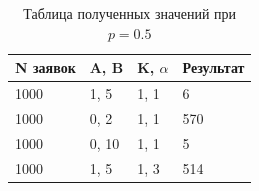 \FloatBarrier
\begin{table}[h]
	\caption{Таблица полученных значений при $ p = 0.5 $}
	\centering
	\begin{tabular}{ | l | l | l | l |}
		\hline
		N заявок & A, B & K, $\alpha$ & Результат \\
		\hline
		1000 & 1, 5 & 1, 1 & 6 \\
		\hline
		1000 & 0, 2 & 1, 1 & 570  \\
		\hline
		1000 & 0, 10 & 1, 1 & 5  \\
		\hline
		1000 & 1, 5 & 1, 3 & 514 \\
		\hline
	\end{tabular}
\end{table}
\FloatBarrier